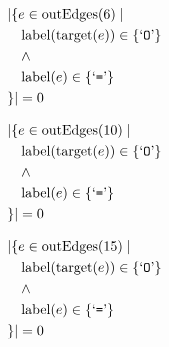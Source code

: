 \begin{align*}
&|\{e \in \mathrm{outEdges}(6)  \mid \\
&\quad \mathrm{label}(\mathrm{target}(e)) \in \{ \text{`\texttt{O}'} \}\\
&\quad \wedge\\
&\quad \mathrm{label}(e) \in \{ \text{`\texttt{=}'} \}\\
&\}| = 0
\end{align*}

\begin{align*}
&|\{e \in \mathrm{outEdges}(10)  \mid \\
&\quad \mathrm{label}(\mathrm{target}(e)) \in \{ \text{`\texttt{O}'} \}\\
&\quad \wedge\\
&\quad \mathrm{label}(e) \in \{ \text{`\texttt{=}'} \}\\
&\}| = 0
\end{align*}

\begin{align*}
&|\{e \in \mathrm{outEdges}(15)  \mid \\
&\quad \mathrm{label}(\mathrm{target}(e)) \in \{ \text{`\texttt{O}'} \}\\
&\quad \wedge\\
&\quad \mathrm{label}(e) \in \{ \text{`\texttt{=}'} \}\\
&\}| = 0
\end{align*}

